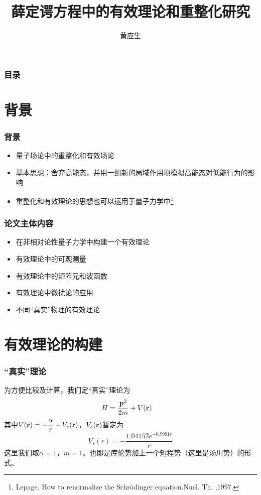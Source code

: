 \documentclass[8pt]{beamer}
\title{薛定谔方程中的有效理论和重整化研究}
\author{黄应生}
\institute{山东大学物理学院}
\begin{document}
\maketitle

\begin{frame}
  \frametitle{目录}
  \tableofcontents
\end{frame}

\section{背景}
\begin{frame}
\frametitle{背景}
\begin{itemize}
  \item 量子场论中的重整化和有效场论
  \vspace{12pt}
  \item 基本思想：舍弃高能态，并用一组新的局域作用项模拟高能态对低能行为的影响
  \vspace{12pt}
  \item 重整化和有效理论的思想也可以运用于量子力学中\footnote{Lepage. How to renormalize the Schr\"odinger equation.Nucl. Th. ,1997.}
\end{itemize}

\end{frame}

\begin{frame}
\frametitle{论文主体内容}
\begin{itemize}
  \item 在非相对论性量子力学中构建一个有效理论
  \vspace{12pt}
  \item 有效理论中的可观测量
  \vspace{12pt}
  \item 有效理论中的矩阵元和波函数
  \vspace{12pt}
  \item 有效理论中微扰论的应用
  \vspace{12pt}
  \item 不同“真实”物理的有效理论
\end{itemize}
\end{frame}

\section{有效理论的构建}
\begin{frame}
\frametitle{“真实”理论}
为方便比较及计算，我们定“真实”理论为
\begin{align}
	H                             & =\frac{\vb{p}^2}{2m}+V(\vb{r}) 
\end{align}
其中$V(\vb{r})=-\dfrac{\alpha}{r}+V_s(\vb{r})$，$V_s(\vb{r})$暂定为
\begin{equation}
  V_s(r)=-\frac{1.04152e^{-0.9991r}}{r}
\end{equation}
这里我们取$\alpha=1$，$m=1$。也即是库伦势加上一个短程势（这里是汤川势）的形式。
\end{frame}
\end{document}
